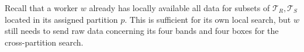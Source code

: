 Recall that a worker $w$ already has locally available all data for subsets of $\mathcal{T}_{R}, \mathcal{T}_{S}$ located in its assigned partition $p$. This is sufficient for its own local search, but $w$ still needs to send raw data concerning its four bands and four boxes for the cross-partition search.




